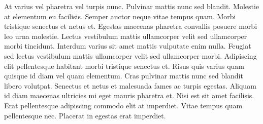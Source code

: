 \documentclass[epsf,a4paper]{book}
\begin{document}
At varius vel pharetra vel turpis nunc. Pulvinar mattis nunc sed blandit. Molestie at elementum eu facilisis. Semper auctor neque vitae tempus quam. Morbi tristique senectus et netus et. Egestas maecenas pharetra convallis posuere morbi leo urna molestie. Lectus vestibulum mattis ullamcorper velit sed ullamcorper morbi tincidunt. Interdum varius sit amet mattis vulputate enim nulla. Feugiat sed lectus vestibulum mattis ullamcorper velit sed ullamcorper morbi. Adipiscing elit pellentesque habitant morbi tristique senectus et. Risus quis varius quam quisque id diam vel quam elementum. Cras pulvinar mattis nunc sed blandit libero volutpat. Senectus et netus et malesuada fames ac turpis egestas. Aliquam id diam maecenas ultricies mi eget mauris pharetra et. Nisi est sit amet facilisis. Erat pellentesque adipiscing commodo elit at imperdiet. Vitae tempus quam pellentesque nec. Placerat in egestas erat imperdiet.

\appendix
\backmatter{}
\end{document}
